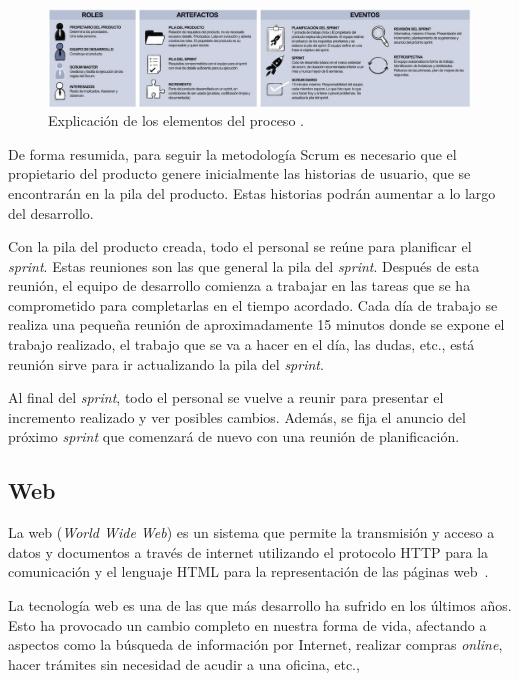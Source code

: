 \begin{figure}
	\centering
	\includegraphics[width=\textwidth]{../img/Scrum/Scrum1.png}
	\caption{Explicación de los elementos del proceso \cite{scrum}.}\label{ProcesoScrum2}
\end{figure}


De forma resumida, para seguir la metodología Scrum es necesario que el propietario del producto genere inicialmente las historias de usuario, que se encontrarán en la pila del producto. Estas historias podrán aumentar a lo largo del desarrollo.

Con la pila del producto creada, todo el personal se reúne para planificar el \textit{sprint}. Estas reuniones son las que general la pila del \textit{sprint}.
Después de esta reunión, el equipo de desarrollo comienza a trabajar en las tareas que se ha comprometido para completarlas en el tiempo acordado. Cada día de trabajo se realiza una pequeña reunión de aproximadamente 15 minutos donde se expone el trabajo realizado, el trabajo que se va a hacer en el día, las dudas, etc., está reunión sirve para ir actualizando la pila del \textit{sprint}. 

Al final del \textit{sprint}, todo el personal se vuelve a reunir para presentar el incremento realizado y ver posibles cambios. Además, se fija el anuncio del próximo \textit{sprint} que comenzará de nuevo con una reunión de planificación.


\subsection{Web}
La web (\textit{World Wide Web}) es un sistema que permite la transmisión y acceso a datos y documentos a través de internet utilizando el protocolo HTTP para la comunicación y el lenguaje HTML para la representación de las páginas web~\cite{wiki:web}.

La tecnología web es una de las que más desarrollo ha sufrido en los últimos años. Esto ha provocado un cambio completo en nuestra forma de vida, afectando a aspectos como la búsqueda de información por Internet, realizar compras \textit{online}, hacer trámites sin necesidad de acudir a una oficina, etc.,

